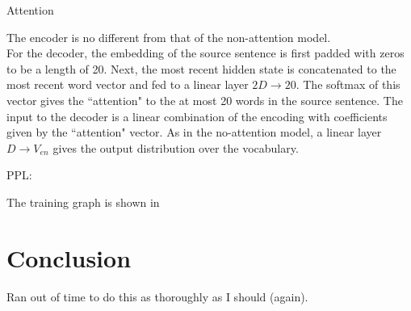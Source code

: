 \documentclass[11pt]{article}
\begin{document}
\begin{subsection}{Attention}

The encoder is no different from that of the non-attention model.\\
For the decoder, the embedding of the source sentence is first padded with zeros to be a length of 20. Next, the most recent hidden state is concatenated to the most recent word vector and fed to a linear layer $2D \rightarrow 20$. The softmax of this vector gives the ``attention" to the at most 20 words in the source sentence. The input to the decoder is a linear combination of the encoding with coefficients given by the ``attention" vector. As in the no-attention model, a linear layer $D \rightarrow V_{en}$ gives the output distribution over the vocabulary.\\
\centerline{PPL: }
The training graph is shown in 

\end{subsection}






%
%
%
%
%


\section{Conclusion}
Ran out of time to do this as thoroughly as I should (again).
\end{document}
